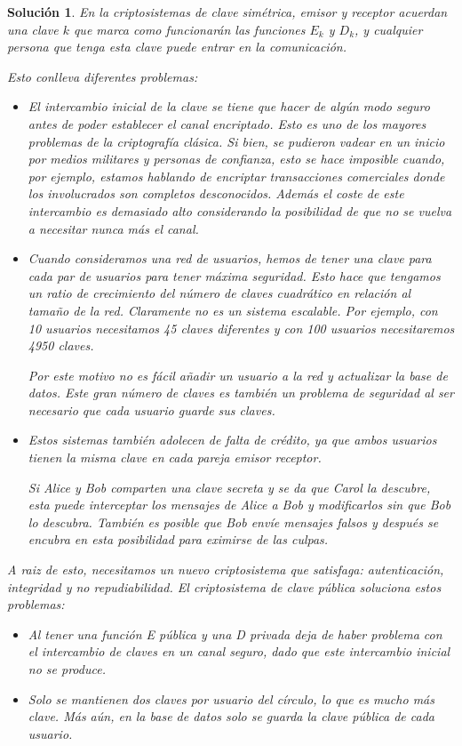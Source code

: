\documentclass[
  a4paper,
  spanish,
  12pt,
]{scrartcl}
\theoremstyle{ejercicio-style}
\theoremstyle{remark-style}
\newtheorem*{sol}{Solución}
\begin{document}
\begin{sol}
  En la criptosistemas de clave simétrica, emisor y receptor acuerdan una clave $k$ que marca como funcionarán las funciones $E_k$ y $D_k$, y cualquier persona que tenga esta clave puede entrar en la comunicación.

Esto conlleva diferentes problemas:
\begin{itemize}
\item El intercambio inicial de la clave se tiene que hacer de algún modo seguro antes de poder establecer el canal encriptado. Esto es uno de los mayores problemas de la criptografía clásica. Si bien, se pudieron vadear en un inicio por medios militares y personas de confianza, esto se hace imposible cuando, por ejemplo, estamos hablando de encriptar transacciones comerciales donde los involucrados son completos desconocidos. Además el coste de este intercambio es demasiado alto considerando la posibilidad de que no se vuelva a necesitar nunca más el canal.
\item Cuando consideramos una red de usuarios, hemos de tener una clave para cada par de usuarios para tener máxima seguridad. Esto hace que tengamos un ratio de crecimiento del número de claves cuadrático en relación al tamaño de la red. Claramente no es un sistema escalable. Por ejemplo, con 10 usuarios necesitamos 45 claves diferentes y con 100 usuarios necesitaremos 4950 claves.

Por este motivo no es fácil añadir un usuario a la red y actualizar la base de datos. Este gran número de claves es también un problema de seguridad al ser necesario que cada usuario guarde sus claves.

\item Estos sistemas también adolecen de falta de crédito, ya que ambos usuarios tienen la misma clave en cada pareja emisor receptor.

Si Alice y Bob comparten una clave secreta y se da que Carol la descubre, esta puede interceptar los mensajes de Alice a Bob y modificarlos sin que Bob lo descubra. También es posible que Bob envíe mensajes falsos y después se encubra en esta posibilidad para eximirse de las culpas.
\end{itemize}

A raiz de esto, necesitamos un nuevo criptosistema que satisfaga: autenticación, integridad y no repudiabilidad. El criptosistema de clave pública soluciona estos problemas:
\begin{itemize}
\item Al tener una función E pública y una D privada deja de haber problema con el intercambio de claves en un canal seguro, dado que este intercambio inicial no se produce.
\item Solo se mantienen dos claves por usuario del círculo, lo que es mucho más clave. Más aún, en la base de datos solo se guarda la clave pública de cada usuario.


\end{itemize}
\end{sol}
\end{document}
